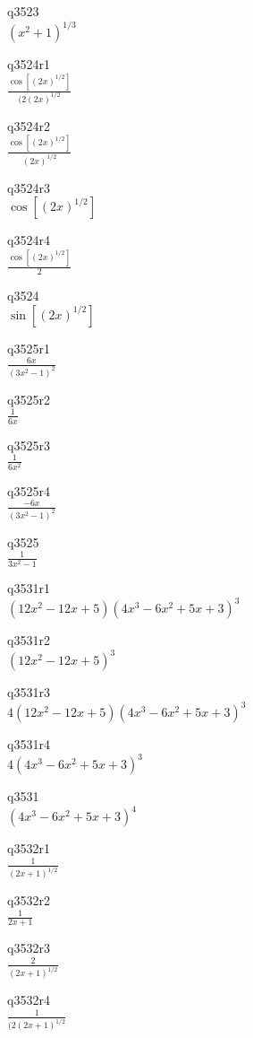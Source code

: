 q3523\\
\(\displaystyle (x^2 + 1)^{1/3} \)

q3524r1\\
\(\displaystyle \frac{\cos[(2x)^{1/2}]}{(2(2x)^{1/2}} \)

q3524r2\\
\(\displaystyle \frac{\cos[(2x)^{1/2}]}{(2x)^{1/2}} \)

q3524r3\\
\(\displaystyle \cos[(2x)^{1/2}] \)

q3524r4\\
\(\displaystyle \frac{\cos[(2x)^{1/2}]}{2} \)

q3524\\
\(\displaystyle \sin[(2x)^{1/2}] \)

q3525r1\\
\(\displaystyle \frac{6x}{(3x^2 - 1)^2} \)

q3525r2\\
\(\displaystyle \frac{1}{6x} \)

q3525r3\\
\(\displaystyle \frac{1}{6x^2} \)

q3525r4\\
\(\displaystyle \frac{-6x}{(3x^2 - 1)^2} \)

q3525\\
\(\displaystyle \frac{1}{3x^2 - 1} \)

q3531r1\\
\(\displaystyle (12x^2 - 12x + 5)(4x^3 - 6x^2 + 5x + 3)^3 \)

q3531r2\\
\(\displaystyle (12x^2 - 12x + 5)^3 \)

q3531r3\\
\(\displaystyle 4(12x^2 - 12x + 5)(4x^3 - 6x^2 + 5x + 3)^3 \)

q3531r4\\
\(\displaystyle 4(4x^3 - 6x^2 + 5x + 3)^3 \)

q3531\\
\(\displaystyle (4x^3 - 6x^2 + 5x + 3)^4 \)

q3532r1\\
\(\displaystyle \frac{1}{(2x + 1)^{1/2}} \)

q3532r2\\
\(\displaystyle \frac{1}{2x + 1} \)

q3532r3\\
\(\displaystyle \frac{2}{(2x + 1)^{1/2}} \)

q3532r4\\
\(\displaystyle \frac{1}{(2(2x + 1)^{1/2}} \)

